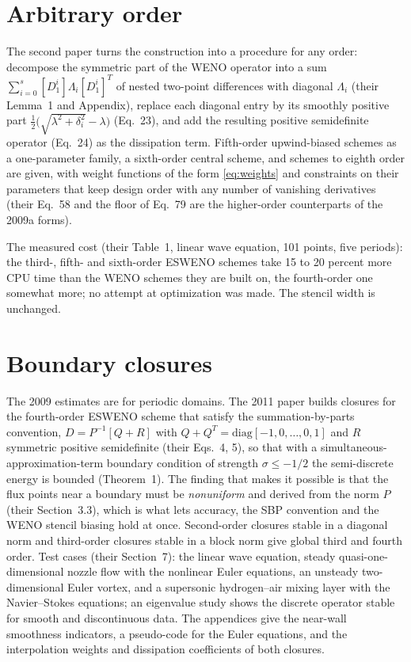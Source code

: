 \documentclass[english,a4paper]{my_memo}
\begin{document}
\section{Arbitrary order \citep{Yamaleev2009b}}

The second paper turns the construction into a procedure for any order:
decompose the symmetric part of the WENO operator into a sum
$\sum_{i=0}^{s}[D_1^{i}]\Lambda_i[D_1^{i}]^{T}$ of nested two-point
differences with diagonal $\Lambda_i$ (their Lemma~1 and Appendix),
replace each diagonal entry by its smoothly positive part
$\tfrac12\big(\sqrt{\lambda^2+\delta_i^2} - \lambda\big)$ (Eq.~23), and add
the resulting positive semidefinite operator (Eq.~24) as the dissipation
term. Fifth-order upwind-biased schemes as a one-parameter family, a
sixth-order central scheme, and schemes to eighth order are given, with
weight functions of the form \eqref{eq:weights} and constraints on their
parameters that keep design order with any number of vanishing derivatives
(their Eq.~58 and the floor of Eq.~79 are the higher-order counterparts of
the 2009a forms).

The measured cost (their Table~1, linear wave equation, 101 points, five
periods): the third-, fifth- and sixth-order ESWENO schemes take 15 to 20
percent more CPU time than the WENO schemes they are built on, the
fourth-order one somewhat more; no attempt at optimization was made. The
stencil width is unchanged.

\section{Boundary closures \citep{Fisher2011}}

The 2009 estimates are for periodic domains. The 2011 paper builds
closures for the fourth-order ESWENO scheme that satisfy the
summation-by-parts convention, $D = P^{-1}[Q + R]$ with
$Q + Q^{T} = \mathrm{diag}[-1, 0, \ldots, 0, 1]$ and $R$ symmetric positive
semidefinite (their Eqs.~4, 5), so that with a simultaneous-approximation-term
boundary condition of strength $\sigma \le -1/2$ the semi-discrete energy is
bounded (Theorem~1). The finding that makes it possible is that the flux
points near a boundary must be \emph{nonuniform} and derived from the norm
$P$ (their Section~3.3), which is what lets accuracy, the SBP convention and
the WENO stencil biasing hold at once. Second-order closures stable in a
diagonal norm and third-order closures stable in a block norm give global
third and fourth order. Test cases (their Section~7): the linear wave
equation, steady quasi-one-dimensional nozzle flow with the nonlinear Euler
equations, an unsteady two-dimensional Euler vortex, and a supersonic
hydrogen--air mixing layer with the Navier--Stokes equations; an eigenvalue
study shows the discrete operator stable for smooth and discontinuous data.
The appendices give the near-wall smoothness indicators, a pseudo-code for
the Euler equations, and the interpolation weights and dissipation
coefficients of both closures.
\end{document}
